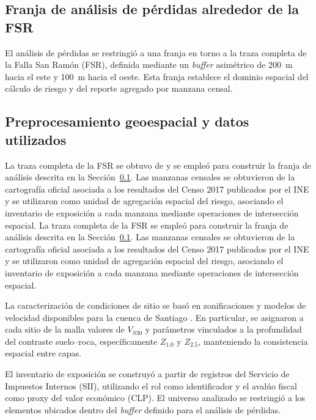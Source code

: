 \subsection{Franja de análisis de pérdidas alrededor de la FSR}
\label{sec:meto_buffer}

El análisis de pérdidas se restringió a una franja en torno a la traza completa de la Falla San Ramón (FSR), definida mediante un \textit{buffer} asimétrico de 200~m hacia el este y 100~m hacia el oeste. Esta franja establece el dominio espacial del cálculo de riesgo y del reporte agregado por manzana censal.

\subsection{Preprocesamiento geoespacial y datos utilizados}
\label{sec:meto_capas}

\ifincludeprivatedata
La traza completa de la FSR se obtuvo de  y se empleó para construir la franja de análisis descrita en la Sección~\ref{sec:meto_buffer}. Las manzanas censales se obtuvieron de la cartografía oficial asociada a los resultados del Censo 2017 publicados por el INE  y se utilizaron como unidad de agregación espacial del riesgo, asociando el inventario de exposición a cada manzana mediante operaciones de intersección espacial.
\else
La traza completa de la FSR se empleó para construir la franja de análisis descrita en la Sección~\ref{sec:meto_buffer}. Las manzanas censales se obtuvieron de la cartografía oficial asociada a los resultados del Censo 2017 publicados por el INE  y se utilizaron como unidad de agregación espacial del riesgo, asociando el inventario de exposición a cada manzana mediante operaciones de intersección espacial.
\fi

La caracterización de condiciones de sitio se basó en zonificaciones y modelos de velocidad disponibles para la cuenca de Santiago . En particular, se asignaron a cada sitio de la malla valores de $V_{S30}$ y parámetros vinculados a la profundidad del contraste suelo--roca, específicamente $Z_{1.0}$ y $Z_{2.5}$, manteniendo la consistencia espacial entre capas.

El inventario de exposición se construyó a partir de registros del Servicio de Impuestos Internos (SII), utilizando el rol como identificador y el avalúo fiscal como proxy del valor económico (CLP). El universo analizado se restringió a los elementos ubicados dentro del \textit{buffer} definido para el análisis de pérdidas.

